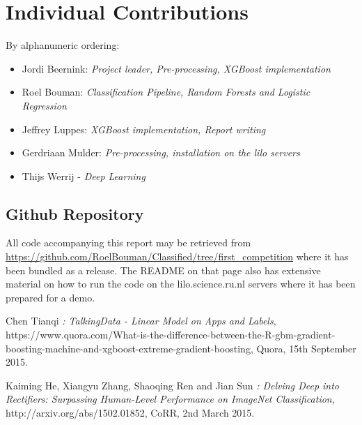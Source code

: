 \documentclass[runningheads,a4paper]{llncs}
\begin{document}
\section{Individual Contributions}
By alphanumeric ordering:
\begin{itemize}
\item Jordi Beernink: \textit{Project leader, Pre-processing, XGBoost implementation}
\item Roel Bouman: \textit{Classification Pipeline, Random Forests and Logistic Regression}
\item Jeffrey Luppes: \textit{XGBoost implementation, Report writing}
\item Gerdriaan Mulder: \textit{Pre-processing, installation on the lilo servers}
\item Thijs Werrij - \textit{Deep Learning}
\end{itemize}
\subsection{Github Repository}
All code accompanying this report may be retrieved from \url{https://github.com/RoelBouman/Classified/tree/first_competition} where it has been bundled as a release. The README on that page also has extensive material on how to run the code on the lilo.science.ru.nl servers where it has been prepared for a demo. 

{}

\begin{thebibliography}{9}

Chen Tianqi
\emph{: TalkingData - Linear Model on Apps and Labels},
https://www.quora.com/What-is-the-difference-between-the-R-gbm-gradient-boosting-machine-and-xgboost-extreme-gradient-boosting,
Quora,
15th September 2015.

Kaiming He, Xiangyu Zhang, Shaoqing Ren and Jian Sun
\emph{: Delving Deep into Rectifiers: Surpassing Human-Level Performance on ImageNet Classification},
http://arxiv.org/abs/1502.01852,
CoRR,
2nd March 2015.  

\end{thebibliography}
\end{document}
